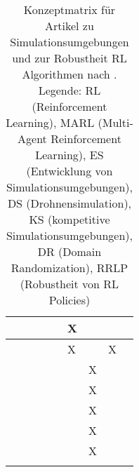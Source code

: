 \begin{longtable}{|l|llllllll|}
    \cite[]{Pan.2021}             & \multicolumn{1}{l|}{}   & \multicolumn{1}{l|}{}    & \multicolumn{1}{l|}{}   & \multicolumn{1}{l|}{}   & \multicolumn{1}{l|}{X}   & \multicolumn{1}{l|}{}   & \multicolumn{1}{l|}{}      \\ \hline
    \cite[]{Zhai.2022}            & \multicolumn{1}{l|}{}   & \multicolumn{1}{l|}{}    & \multicolumn{1}{l|}{}   & \multicolumn{1}{l|}{}   & \multicolumn{1}{l|}{X}   & \multicolumn{1}{l|}{}   & \multicolumn{1}{l|}{X}     \\ \hline
    \cite[]{Tobin.2017}           & \multicolumn{1}{l|}{}   & \multicolumn{1}{l|}{}    & \multicolumn{1}{l|}{}   & \multicolumn{1}{l|}{}   & \multicolumn{1}{l|}{}   & \multicolumn{1}{l|}{X}   & \multicolumn{1}{l|}{}     \\ \hline
    \cite[]{Chen.2021}            & \multicolumn{1}{l|}{}   & \multicolumn{1}{l|}{}    & \multicolumn{1}{l|}{}   & \multicolumn{1}{l|}{}   & \multicolumn{1}{l|}{}   & \multicolumn{1}{l|}{X}   & \multicolumn{1}{l|}{}     \\ \hline
    \cite[]{Hsu.2023}             & \multicolumn{1}{l|}{}   & \multicolumn{1}{l|}{}    & \multicolumn{1}{l|}{}   & \multicolumn{1}{l|}{}   & \multicolumn{1}{l|}{}   & \multicolumn{1}{l|}{X}   & \multicolumn{1}{l|}{}     \\ \hline
    \cite[]{Alghonaim.5302021652021}& \multicolumn{1}{l|}{}   & \multicolumn{1}{l|}{}    & \multicolumn{1}{l|}{}   & \multicolumn{1}{l|}{}   & \multicolumn{1}{l|}{}   & \multicolumn{1}{l|}{X}   & \multicolumn{1}{l|}{}     \\ \hline
    \cite[]{Sadeghi.2016}         & \multicolumn{1}{l|}{}   & \multicolumn{1}{l|}{}    & \multicolumn{1}{l|}{}   & \multicolumn{1}{l|}{}   & \multicolumn{1}{l|}{}   & \multicolumn{1}{l|}{X}   & \multicolumn{1}{l|}{}     \\ \hline
    \caption{Konzeptmatrix für Artikel zu Simulationsumgebungen und zur Robustheit RL Algorithmen nach \cite[]{10.5555/2017160.2017162}. 
    Legende: RL (Reinforcement Learning), MARL (Multi-Agent Reinforcement Learning), ES (Entwicklung von Simulationsumgebungen), DS (Drohnensimulation), KS (kompetitive Simulationsumgebungen), DR (Domain Randomization), RRLP (Robustheit von RL Policies)}
    \label{tab:research-table}\\
\end{longtable}